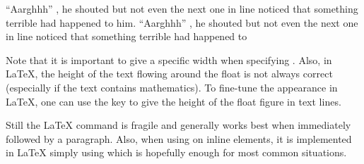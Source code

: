 \documentclass{book}
\begin{document}
\begin{mdDiv}[class={sample},elem={sample},margin-bottom={2ex},data-line={2632}]
\begin{mdDiv}[class={sampleblock},elem={sampleblock},padding-left={1em},padding-right={1em},padding-top={-1ex},border-style={solid},border-width={1\cssPixel},line-adjust={0},data-line={2633}]
{\begin{mdDiv}
\begin{mdDiv}[data-line={2652}]
{}%
\end{mdDiv}%
\end{mdDiv}%
}\begin{mdP}[data-line={2652}]%
{}{\textquotedblleft}Aarghhh{\textquotedblright}%
{}, he shouted but not even the next
one in line noticed that something
terrible had happened to him. 
{}{\textquotedblleft}Aarghhh{\textquotedblright}%
{}, he shouted but not even the next
one in line noticed that something
terrible had happened to%
{} %
{}%
\end{mdP}%
\end{mdDiv}%
\end{mdDiv}%
\begin{mdP}[data-line={2646}]%
{}Note that it is important to give a specific width when specifying %
{}%
{}.
Also, in LaTeX, the height of the text flowing around the float is not always
correct (especially if the text contains mathematics). To fine-tune the appearance
in LaTeX, one can use the %
{}%
{} key to give the height of the float figure in 
text lines.%
\end{mdP}%
\begin{mdP}[class={indent},data-line={2652}]%
{}Still the LaTeX command is fragile and generally works best when immediately
followed by a paragraph. Also, when using %
{}%
{} on inline elements, it is
implemented in LaTeX simply using %
{}%
{} which is hopefully enough for most 
common situations.%
\end{mdP}%
\end{document}
